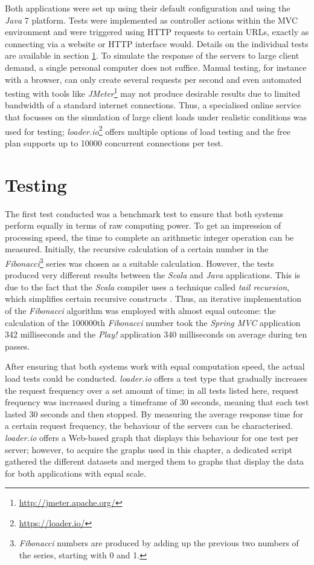 Both applications were set up using their default configuration and using the \textit{Java} 7 platform. Tests were implemented as controller actions within the MVC environment and were triggered using HTTP requests to certain URLs, exactly as connecting via a website or HTTP interface would. Details on the individual tests are available in section \ref{lab:testing}. To simulate the response of the servers to large client demand, a single personal computer does not suffice. Manual testing, for instance with a browser, can only create several requests per second and even automated testing with tools like \textit{JMeter}\footnote{\url{http://jmeter.apache.org/}} may not produce desirable results due to limited bandwidth of a standard internet connections. Thus, a specialised online service that focusses on the simulation of large client loads under realistic conditions was used for testing; \textit{loader.io}\footnote{\url{https://loader.io/}} offers multiple options of load testing and the free plan supports up to 10000 concurrent connections per test.

\section{Testing} 
\label{lab:testing}
The first test conducted was a benchmark test to ensure that both systems perform equally in terms of raw computing power. To get an impression of processing speed, the time to complete an arithmetic integer operation can be measured. Initially, the recursive calculation of a certain number in the \textit{Fibonacci}\footnote{\textit{Fibonacci} numbers are produced by adding up the previous two numbers of the series, starting with 0 and 1.} series was chosen as a suitable calculation. However, the tests produced very different results between the \textit{Scala} and \textit{Java} applications. This is due to the fact that the \textit{Scala} compiler uses a technique called \textit{tail recursion}, which simplifies certain recursive constructs \cite{Malone2008}. Thus, an iterative implementation of the \textit{Fibonacci} algorithm was employed with almost equal outcome: the calculation of the 100000th \textit{Fibonacci} number took the \textit{Spring MVC} application 342 milliseconds and the \textit{Play!} application 340 milliseconds on average during ten passes.

After ensuring that both systems work with equal computation speed, the actual load tests could be conducted. \textit{loader.io} offers a test type that gradually increases the request frequency over a set amount of time; in all tests listed here, request frequency was increased during a timeframe of 30 seconds, meaning that each test lasted 30 seconds and then stopped. By measuring the average response time for a certain request frequency, the behaviour of the servers can be characterised. \textit{loader.io} offers a Web-based graph that displays this behaviour for one test per server; however, to acquire the graphs used in this chapter, a dedicated script gathered the different datasets and merged them to graphs that display the data for both applications with equal scale.

